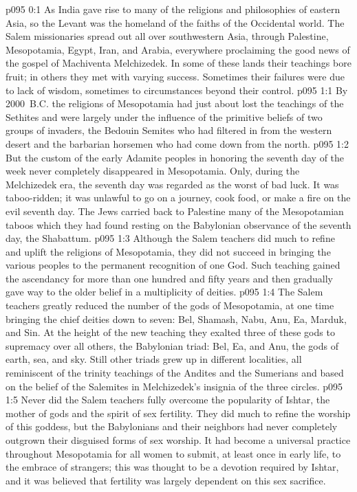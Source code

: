 \author{Melchizedek}
\vs p095 0:1 As India gave rise to many of the religions and philosophies of eastern Asia, so the Levant was the homeland of the faiths of the Occidental world. The Salem missionaries spread out all over southwestern Asia, through Palestine, Mesopotamia, Egypt, Iran, and Arabia, everywhere proclaiming the good news of the gospel of Machiventa Melchizedek. In some of these lands their teachings bore fruit; in others they met with varying success. Sometimes their failures were due to lack of wisdom, sometimes to circumstances beyond their control.\plusone
{}
\vs p095 1:1 By 2000~B.C. the religions of Mesopotamia had just about lost the teachings of the Sethites and were largely under the influence of the primitive beliefs of two groups of invaders, the Bedouin Semites who had filtered in from the western desert and the barbarian horsemen who had come down from the north.
\vs p095 1:2 But the custom of the early Adamite peoples in honoring the seventh day of the week never completely disappeared in Mesopotamia. Only, during the Melchizedek era, the seventh day was regarded as the worst of bad luck. It was taboo\hyp{}ridden; it was unlawful to go on a journey, cook food, or make a fire on the evil seventh day. The Jews carried back to Palestine many of the Mesopotamian taboos which they had found resting on the Babylonian observance of the seventh day, the Shabattum.
\vs p095 1:3 Although the Salem teachers did much to refine and uplift the religions of Mesopotamia, they did not succeed in bringing the various peoples to the permanent recognition of one God. Such teaching gained the ascendancy for more than one hundred and fifty years and then gradually gave way to the older belief in a multiplicity of deities.
\vs p095 1:4 The Salem teachers greatly reduced the number of the gods of Mesopotamia, at one time bringing the chief deities down to seven: Bel, Shamash, Nabu, Anu, Ea, Marduk, and Sin. At the height of the new teaching they exalted three of these gods to supremacy over all others, the Babylonian triad: Bel, Ea, and Anu, the gods of earth, sea, and sky. Still other triads grew up in different localities, all reminiscent of the trinity teachings of the Andites and the Sumerians and based on the belief of the Salemites in Melchizedek’s insignia of the three circles.
\vs p095 1:5 Never did the Salem teachers fully overcome the popularity of Ishtar, the mother of gods and the spirit of sex fertility. They did much to refine the worship of this goddess, but the Babylonians and their neighbors had never completely outgrown their disguised forms of sex worship. It had become a universal practice throughout Mesopotamia for all women to submit, at least once in early life, to the embrace of strangers; this was thought to be a devotion required by Ishtar, and it was believed that fertility was largely dependent on this sex sacrifice.
